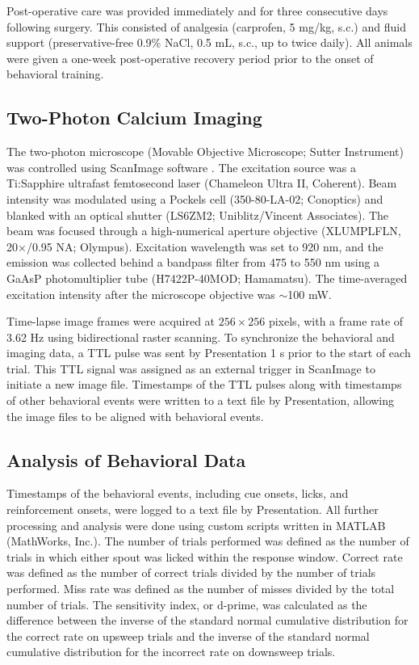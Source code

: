 Post-operative care was provided immediately and for three consecutive days following surgery. This consisted of analgesia (carprofen, 5 mg/kg, s.c.) and fluid support (preservative-free 0.9\% NaCl, 0.5 mL, s.c., up to twice daily). All animals were given a one-week post-operative recovery period prior to the onset of behavioral training.

\subsection*{Two-Photon Calcium Imaging}
The two-photon microscope (Movable Objective Microscope; Sutter Instrument) was controlled using ScanImage software \citep{pologruto2003scanimage}. The excitation source was a Ti:Sapphire ultrafast femtosecond laser (Chameleon Ultra II, Coherent). Beam intensity was modulated using a Pockels cell (350-80-LA-02; Conoptics) and blanked with an optical shutter (LS6ZM2; Uniblitz/Vincent Associates). The beam was focused through a high-numerical aperture objective (XLUMPLFLN, 20$\times$/0.95 NA; Olympus). Excitation wavelength was set to 920 nm, and the emission was collected behind a bandpass filter from 475 to 550 nm using a GaAsP photomultiplier tube (H7422P-40MOD; Hamamatsu). The time-averaged excitation intensity after the microscope objective was $\sim$100 mW. 

Time-lapse image frames were acquired at $256 \times 256$ pixels, with a frame rate of 3.62 Hz using bidirectional raster scanning. To synchronize the behavioral and imaging data, a TTL pulse was sent by Presentation 1 s prior to the start of each trial. This TTL signal was assigned as an external trigger in ScanImage to initiate a new image file. Timestamps of the TTL pulses along with timestamps of other behavioral events were written to a text file by Presentation, allowing the image files to be aligned with behavioral events.

\subsection*{Analysis of Behavioral Data}
Timestamps of the behavioral events, including cue onsets, licks, and reinforcement onsets, were logged to a text file by Presentation. All further processing and analysis were done using custom scripts written in MATLAB (MathWorks, Inc.). The number of trials performed was defined as the number of trials in which either spout was licked within the response window. Correct rate was defined as the number of correct trials divided by the number of trials performed. Miss rate was defined as the number of misses divided by the total number of trials. The sensitivity index, or d-prime, was calculated as the difference between the inverse of the standard normal cumulative distribution for the correct rate on upsweep trials and the inverse of the standard normal cumulative distribution for the incorrect rate on downsweep trials.

